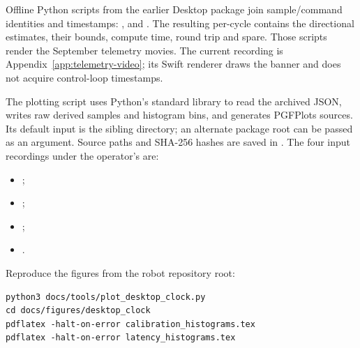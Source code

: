 Offline Python scripts from the earlier Desktop package join sample/command identities and timestamps: ,  and . The resulting per-cycle  contains the directional estimates, their bounds, compute time, round trip and spare. Those scripts render the September telemetry movies. The current recording is Appendix~\ref{app:telemetry-video}; its Swift renderer draws the banner and does not acquire control-loop timestamps.

The plotting script  uses Python's standard library to read the archived JSON, writes raw derived samples and histogram bins, and generates PGFPlots sources. Its default input is the sibling  directory; an alternate package root can be passed as an argument. Source paths and SHA-256 hashes are saved in . The four input recordings under the operator's  are:
\begin{itemize}
\item {};
\item {};
\item {};
\item {}.
\end{itemize}
Reproduce the figures from the robot repository root:
\begin{verbatim}
python3 docs/tools/plot_desktop_clock.py
cd docs/figures/desktop_clock
pdflatex -halt-on-error calibration_histograms.tex
pdflatex -halt-on-error latency_histograms.tex
\end{verbatim}




